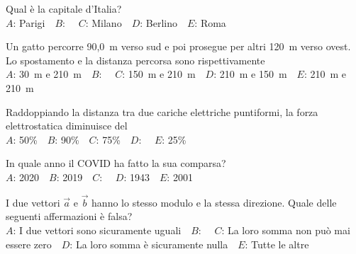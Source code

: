 \mcquestionfooter



\mcpaperfooter

\def\mcserialnumber{31}
\mcpaperheader


\def\mcquestionnumber{1}


\mcquestionheader Qual è la capitale d’Italia?\\
{$A$}: Parigi\ \ {$B$}: \ \ {$C$}: Milano\ \ {$D$}: Berlino\ \ {$E$}: Roma\ \ 

\mcquestionfooter



\def\mcquestionnumber{2}


\mcquestionheader Un gatto percorre 90,0~m verso sud e poi prosegue per altri 120~m verso ovest. Lo spostamento e la distanza percorsa sono rispettivamente\\
{$A$}: 30~m e 210~m\ \ {$B$}: \ \ {$C$}: 150~m e 210~m\ \ {$D$}: 210~m e 150~m\ \ {$E$}: 210~m e 210~m\ \ 

\mcquestionfooter



\def\mcquestionnumber{3}


\mcquestionheader Raddoppiando la distanza tra due cariche elettriche puntiformi, la forza elettrostatica diminuisce del\\
{$A$}: 50\%\ \ {$B$}: 90\%\ \ {$C$}: 75\%\ \ {$D$}: \ \ {$E$}: 25\%\ \ 

\mcquestionfooter



\def\mcquestionnumber{4}


\mcquestionheader In quale anno il COVID ha fatto la sua comparsa?\\
{$A$}: 2020\ \ {$B$}: 2019\ \ {$C$}: \ \ {$D$}: 1943\ \ {$E$}: 2001\ \ 

\mcquestionfooter



\def\mcquestionnumber{5}


\mcquestionheader I due vettori $\vec{a}$ e $\vec{b}$ hanno lo stesso modulo e la stessa direzione. Quale delle seguenti affermazioni è falsa?\\
{$A$}: I due vettori sono sicuramente uguali\ \ {$B$}: \ \ {$C$}: La loro somma non può mai essere zero\ \ {$D$}: La loro somma è sicuramente nulla\ \ {$E$}: Tutte le altre\ \ 

\mcquestionfooter



\def\mcquestionnumber{6}


